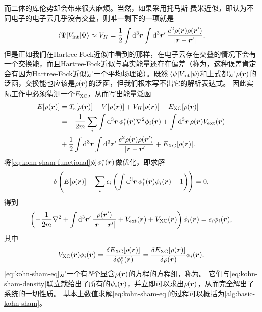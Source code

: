 而二体的库伦势却会带来很大麻烦。当然，如果采用托马斯-费米近似，即认为不同电子的电子云几乎没有交叠，则唯一剩下的一项就是
\[
    \mel{\Psi}{{V}_\text{int}}{\Psi} \approx V_H = \frac{1}{2} \int \dd[3]{\vb*{r}} \int \dd[3]{\vb*{r}'} \frac{e^2 \rho(\vb*{r}) \rho(\vb*{r}')}{\abs{\vb*{r} - \vb*{r}'}},
\]
但是正如我们在Hartree-Fock近似中看到的那样，在电子云存在交叠的情况下会有一个交换能，而且Hartree-Fock近似与真实能量还存在偏差（称为，这种误差肯定会有因为Hartree-Fock近似是一个平均场理论）。既然$\mel{\psi}{{V}_\text{int}}{\psi}$和上式都是$\rho(\vb*{r})$的泛函，交换能也应该是$\rho(\vb*{r})$的泛函，但我们根本写不出它的解析表达式。
因此实际工作中必须猜测一个$E_\text{XC}$，从而写出能量泛函
\begin{equation}
    \begin{aligned}
        E[\rho(\vb*{r})] &= T_\text{s}[\rho(\vb*{r})] + V[\rho(\vb*{r})] + V_H[\rho(\vb*{r})] + E_\text{XC} [\rho(\vb*{r})] \\
        &= - \frac{1}{2m} \sum_i \int \dd[3]{\vb*{r}} \phi_i^*(\vb*{r}) \laplacian \phi_i(\vb*{r})
        + \int \dd[3]{\vb*{r}} \rho(\vb*{r}) V_\text{ext}(\vb*{r}) \\
        &+ \frac{1}{2} \int \dd[3]{\vb*{r}} \int \dd[3]{\vb*{r}'} \frac{e^2 \rho(\vb*{r}) \rho(\vb*{r}')}{\abs{\vb*{r} - \vb*{r}'}} + E_\text{XC} [\rho(\vb*{r})].
    \end{aligned}
    \label{eq:kohn-sham-functional}
\end{equation}
将\eqref{eq:kohn-sham-functional}对$\phi_i^*(\vb*{r})$做优化，即求解
\begin{equation}
    \var \left( E[\rho(\vb*{r})] - \sum_i \epsilon_i \left( \int \dd[3]{\vb*{r}} \phi_i^*(\vb*{r}) \phi_i(\vb*{r}) - 1 \right) \right) = 0,
    \label{eq:dft-variation-principle-shem}
\end{equation}
得到
\begin{equation}
    \left( - \frac{1}{2 m} \laplacian + \int \dd[3]{\vb*{r}'} \frac{\rho(\vb*{r}')}{\abs{\vb*{r} - \vb*{r}'}} + V_\text{ext}(\vb*{r}) + V_\text{XC}(\vb*{r}) \right) \phi_i(\vb*{r}) = \epsilon_i \phi_i(\vb*{r}),
    \label{eq:kohn-sham-eq}
\end{equation}
其中
\begin{equation}
    V_\text{XC}(\vb*{r}) \phi_i(\vb*{r}) = \fdv{E_\text{XC}[\rho(\vb*{r})]}{\phi^*_i(\vb*{r})} = \fdv{E_\text{XC}[\rho(\vb*{r})]}{\rho(\vb*{r})} \phi_i(\vb*{r}).
\end{equation}
\eqref{eq:kohn-sham-eq}是一个有$N$个显含$\rho(\vb*{r})$的方程的方程组，称为。
它们与\eqref{eq:kohn-sham-density}联立就给出了所有的$\psi_i(\vb*{r})$，并立即可以求出$\rho(\vb*{r})$，从而完全解出了系统的一切性质。
基本上数值求解\eqref{eq:kohn-sham-eq}的过程可以概括为\autoref{alg:basic-kohn-sham}。

